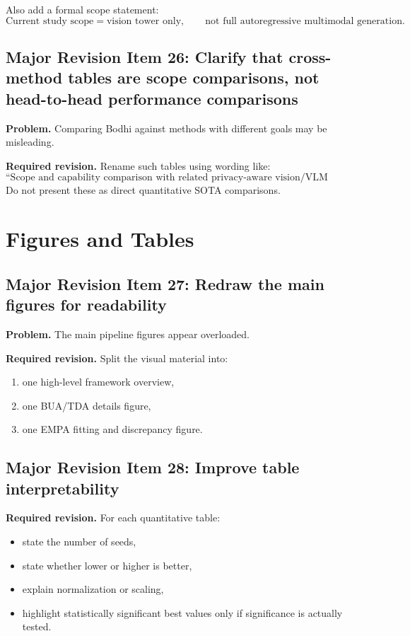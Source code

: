 Also add a formal scope statement:
\[
\text{Current study scope} = \text{vision tower only},
\qquad
\text{not full autoregressive multimodal generation}.
\]

\subsection*{Major Revision Item 26: Clarify that cross-method tables are scope comparisons, not head-to-head performance comparisons}
\textbf{Problem.} Comparing Bodhi against methods with different goals may be misleading.

\textbf{Required revision.}
Rename such tables using wording like:
\[
\text{``Scope and capability comparison with related privacy-aware vision/VLM methods.''}
\]
Do not present these as direct quantitative SOTA comparisons.

\section{Figures and Tables}

\subsection*{Major Revision Item 27: Redraw the main figures for readability}
\textbf{Problem.} The main pipeline figures appear overloaded.

\textbf{Required revision.}
Split the visual material into:
\begin{enumerate}
    \item one high-level framework overview,
    \item one BUA/TDA details figure,
    \item one EMPA fitting and discrepancy figure.
\end{enumerate}

\subsection*{Major Revision Item 28: Improve table interpretability}
\textbf{Required revision.}
For each quantitative table:
\begin{itemize}
    \item state the number of seeds,
    \item state whether lower or higher is better,
    \item explain normalization or scaling,
    \item highlight statistically significant best values only if significance is actually tested.
\end{itemize}


